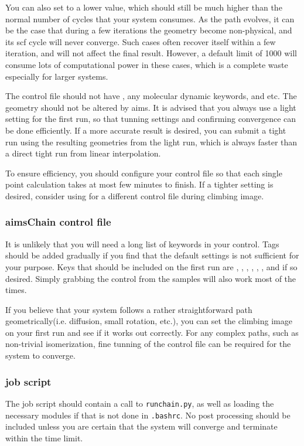 You can also set  to a lower value, which should still be much higher than the normal number of cycles that your system consumes. As the path evolves, it can be the case that during a few iterations the geometry become non-physical, and its scf cycle will never converge. Such cases often recover itself within a few iteration, and will not affect the final result. However, a default limit of 1000 will consume lots of computational power in these cases,  which is a complete waste especially for larger systems. 

The control file should not have , any molecular dynamic keywords, and etc. The geometry should not be altered by aims.  
It is advised that you always use a light setting for the first run, so that tunning settings and confirming convergence can be done efficiently. If a more accurate result is desired, you can submit a tight run using the resulting geometries from the light run, which is always faster than a direct tight run from linear interpolation. 

To ensure efficiency, you should configure your control file so that each single point calculation takes at most few minutes to finish. If a tighter setting is desired, consider using  for a different control file during climbing image. 
\subsubsection*{aimsChain control file}
It is unlikely that you will need a long list of keywords in your control. Tags should be added gradually if you find that the default settings is not sufficient for your purpose.
Keys that should be included on the first run are , , , , , , and  if so desired. Simply grabbing the control from the samples will also work most of the times. 


If you believe that your system follows a rather straightforward path geometrically(i.e. diffusion, small rotation, etc.), you can set the climbing image on your first run and see if it works out correctly. For any complex paths, such as non-trivial isomerization, fine tunning of the control file can be required for the system to converge. 

\subsubsection*{job script}
The job script should contain a call to \texttt{runchain.py}, as well as loading the necessary modules if that is not done in \texttt{.bashrc}. No post processing should be included unless you are certain that the system will converge and terminate within the time limit.
 
